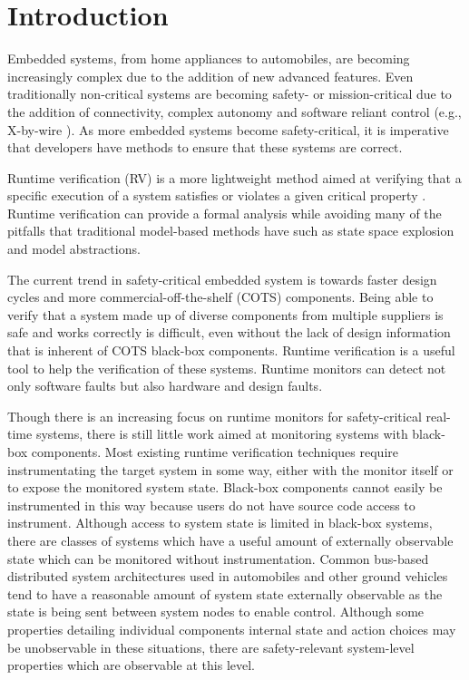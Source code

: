 
\section{Introduction}
Embedded systems, from home appliances to automobiles, are becoming increasingly complex due to the addition of new advanced features. 
Even traditionally non-critical systems are becoming safety- or mission-critical due to the addition of connectivity, complex autonomy and software reliant control (e.g., X-by-wire \cite{Leen2002}).
As more embedded systems become safety-critical, it is imperative that developers have methods to ensure that these systems are correct. 

Runtime verification (RV) is a more lightweight method aimed at verifying that a specific execution of a system satisfies or violates a given critical property \cite{Leucker2009}. 
%
Runtime verification can provide a formal analysis while avoiding many of the pitfalls that traditional model-based methods have such as state space explosion and model abstractions. 

The current trend in safety-critical embedded system is towards faster design cycles and more commercial-off-the-shelf (COTS) components. Being able to verify that a system made up of diverse components from multiple suppliers is safe and works correctly is difficult, even without the lack of design information that is inherent of COTS black-box components.
%
Runtime verification is a useful tool to help the verification of these systems. Runtime monitors can detect not only software faults but also hardware and design faults. 


Though there is an increasing focus on runtime monitors for safety-critical real-time systems, there is still little work aimed at monitoring systems with black-box components. Most existing runtime verification techniques require instrumentating the target system in some way, either with the monitor itself or to expose the monitored system state. Black-box components cannot easily be instrumented in this way because users do not have source code access to instrument. Although access to system state is limited in black-box systems, there are classes of systems which have a useful amount of externally observable state which can be monitored without instrumentation. Common bus-based distributed system architectures used in automobiles and other ground vehicles tend to have a reasonable amount of system state externally observable as the state is being sent between system nodes to enable control. Although some properties detailing individual components internal state and action choices may be unobservable in these situations, there are safety-relevant system-level properties which are observable at this level.

